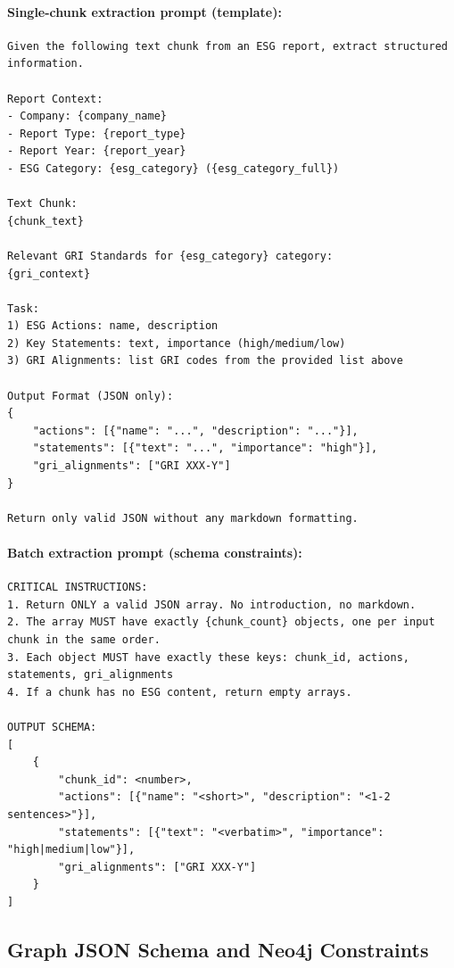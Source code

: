 \documentclass[sn-mathphys, oneside]{sn-jnl}
\begin{document}
\paragraph{Single-chunk extraction prompt (template):}
\begin{lstlisting}[caption={Module 2 single-chunk extraction prompt (template; placeholders shown).},label={lst:m2-single-prompt}]
Given the following text chunk from an ESG report, extract structured information.

Report Context:
- Company: {company_name}
- Report Type: {report_type}
- Report Year: {report_year}
- ESG Category: {esg_category} ({esg_category_full})

Text Chunk:
{chunk_text}

Relevant GRI Standards for {esg_category} category:
{gri_context}

Task:
1) ESG Actions: name, description
2) Key Statements: text, importance (high/medium/low)
3) GRI Alignments: list GRI codes from the provided list above

Output Format (JSON only):
{
    "actions": [{"name": "...", "description": "..."}],
    "statements": [{"text": "...", "importance": "high"}],
    "gri_alignments": ["GRI XXX-Y"]
}

Return only valid JSON without any markdown formatting.
\end{lstlisting}

\paragraph{Batch extraction prompt (schema constraints):}
\begin{lstlisting}[caption={Module 2 batch extraction prompt (schema constraints; shortened).},label={lst:m2-batch-prompt}]
CRITICAL INSTRUCTIONS:
1. Return ONLY a valid JSON array. No introduction, no markdown.
2. The array MUST have exactly {chunk_count} objects, one per input chunk in the same order.
3. Each object MUST have exactly these keys: chunk_id, actions, statements, gri_alignments
4. If a chunk has no ESG content, return empty arrays.

OUTPUT SCHEMA:
[
    {
        "chunk_id": <number>,
        "actions": [{"name": "<short>", "description": "<1-2 sentences>"}],
        "statements": [{"text": "<verbatim>", "importance": "high|medium|low"}],
        "gri_alignments": ["GRI XXX-Y"]
    }
]
\end{lstlisting}

\subsection{Graph JSON Schema and Neo4j Constraints}
\end{document}
